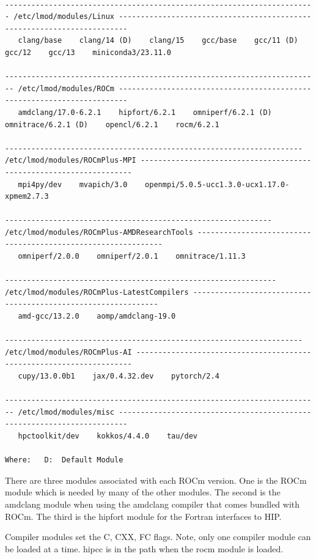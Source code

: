 \documentclass[
]{article}
\begin{document}
{\tiny
\begin{verbatim}

----------------------------------------------------------------------- /etc/lmod/modules/Linux ------------------------------------------------------------------------
   clang/base    clang/14 (D)    clang/15    gcc/base    gcc/11 (D)    gcc/12    gcc/13    miniconda3/23.11.0

------------------------------------------------------------------------ /etc/lmod/modules/ROCm ------------------------------------------------------------------------
   amdclang/17.0-6.2.1    hipfort/6.2.1    omniperf/6.2.1 (D)    omnitrace/6.2.1 (D)    opencl/6.2.1    rocm/6.2.1

-------------------------------------------------------------------- /etc/lmod/modules/ROCmPlus-MPI --------------------------------------------------------------------
   mpi4py/dev    mvapich/3.0    openmpi/5.0.5-ucc1.3.0-ucx1.17.0-xpmem2.7.3

------------------------------------------------------------- /etc/lmod/modules/ROCmPlus-AMDResearchTools --------------------------------------------------------------
   omniperf/2.0.0    omniperf/2.0.1    omnitrace/1.11.3

-------------------------------------------------------------- /etc/lmod/modules/ROCmPlus-LatestCompilers --------------------------------------------------------------
   amd-gcc/13.2.0    aomp/amdclang-19.0

-------------------------------------------------------------------- /etc/lmod/modules/ROCmPlus-AI ---------------------------------------------------------------------
   cupy/13.0.0b1    jax/0.4.32.dev    pytorch/2.4

------------------------------------------------------------------------ /etc/lmod/modules/misc ------------------------------------------------------------------------
   hpctoolkit/dev    kokkos/4.4.0    tau/dev

Where:   D:  Default Module
\end{verbatim}
}
There are three modules associated with each ROCm version. One is the
ROCm module which is needed by many of the other modules. The second is
the amdclang module when using the amdclang compiler that comes bundled
with ROCm. The third is the hipfort module for the Fortran interfaces to
HIP.

Compiler modules set the C, CXX, FC flags. Note, only one compiler
module can be loaded at a time. hipcc is in the path when the rocm
module is loaded.
\end{document}
